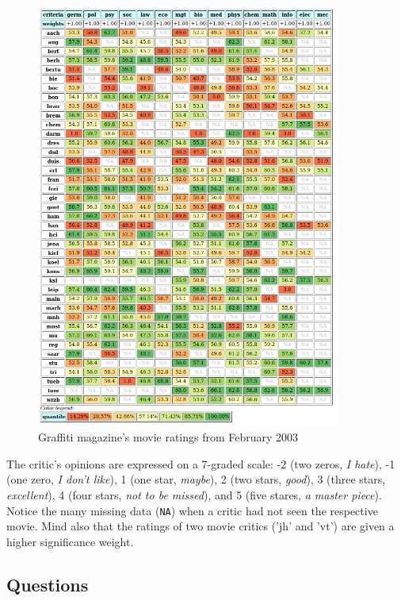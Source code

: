 \begin{figure}[h]
\includegraphics[width=10cm]{Figures/ratingData.png}
\caption{Graffiti magazine's movie ratings from February 2003}
\label{fig:15.1}       %
\end{figure}

The critic's opinions are expressed on a 7-graded scale: -2 (two zeros, \emph{I hate}), -1 (one zero, \emph{I don't like}), 1 (one star, \emph{maybe}), 2 (two stars, \emph{good}), 3 (three stars, \emph{excellent}), 4 (four stars, \emph{not to be missed}), and 5 (five stares, \emph{a master piece}). Notice the many missing data (\texttt{NA}) when a critic had not seen the respective movie. Mind also that the ratings of two movie critics ('jh' and 'vt') are given a higher significance weight.

\subsection{Questions}
\label{15.2.2}

